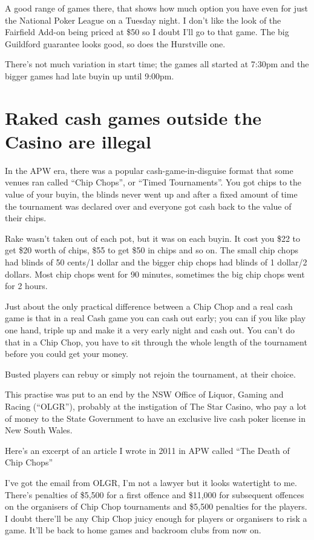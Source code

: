 A good range of games there, that shows how much option you
have even for just the National Poker League on a Tuesday night.
I don't like the look of the Fairfield Add-on being priced at \$50
so I doubt I'll go to that game. The big Guildford guarantee looks
good, so does the Hurstville one.

There's not much variation in start time; the games all started
at 7:30pm and the bigger games had late buyin up until 9:00pm.

\section{Raked cash games outside the Casino are illegal}

In the APW era, there was a popular
cash-game-in-disguise format that some venues ran
called ``Chip Chops'', or ``Timed Tournaments''.
You got chips to the value of
your buyin, the blinds never went up and after a fixed
amount of time the tournament was declared over and
everyone got cash back to the value of their chips.

Rake wasn't taken out of each pot, but it was on each buyin.
It cost you \$22 to get \$20 worth of chips, \$55 to get
\$50 in chips and so on. The small chip chops had blinds of
50 cents/1 dollar and the bigger chip chops had blinds of
1 dollar/2 dollars. Most chip chops went for 90 minutes,
sometimes the big chip chops went for 2 hours.

Just about the only practical difference between a
Chip Chop and a real cash game is that in a real Cash game
you can cash out early; you can if you like play one hand,
triple up and make it a very early night and cash out.
You can't do that in a Chip Chop, you have to sit through
the whole length of the tournament before you could get your money.

Busted players can rebuy or simply not rejoin the tournament,
at their choice.

This practise was put to an end by the NSW Office of Liquor,
Gaming and Racing (``OLGR''), probably at the instigation of The Star Casino,
who pay a lot of money to the State Government to
have an exclusive live cash poker license in New South Wales.

Here's an excerpt of an article I wrote in 2011 in APW called
``The Death of Chip Chops''


I've got the email from OLGR, I'm not a lawyer but it looks watertight
to me. There's penalties of \$5,500 for a first offence and \$11,000 for
subsequent offences on the organisers of Chip Chop tournaments and
\$5,500 penalties for the players. I doubt there'll be any Chip Chop
juicy enough for players or organisers to risk a game. It'll be back
to home games and backroom clubs from now on.

